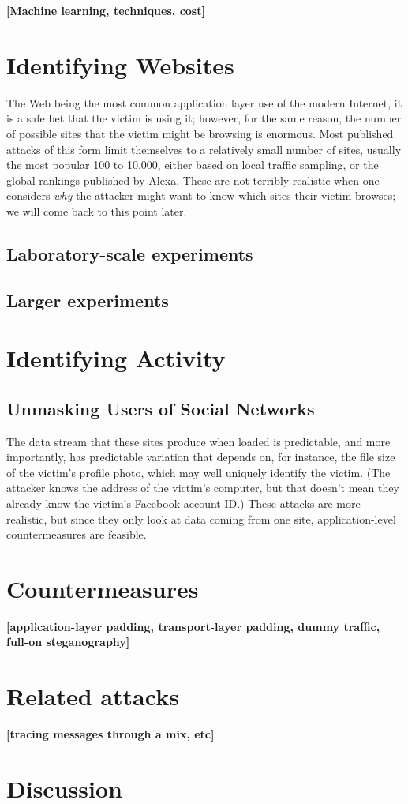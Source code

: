 \documentclass{zarticle}
\def\todo#1{{\color{todocolor}\bfseries [#1]}}
\begin{document}
\todo{Machine learning, techniques, cost}

\section{Identifying Websites}

The Web being the most common application layer use of the modern
Internet, it is a safe bet that the victim is using it; however, for
the same reason, the number of possible sites that the victim might be
browsing is enormous.  Most published attacks of this form limit
themselves to a relatively small number of sites, usually the most
popular 100 to 10,000, either based on local traffic sampling, or the
global rankings published by Alexa.  These are not terribly realistic
when one considers \emph{why} the attacker might want to know which
sites their victim browses; we will come back to this point later.

\subsection{Laboratory-scale experiments}

\subsection{Larger experiments}

\section{Identifying Activity}

\subsection{Unmasking Users of Social Networks}

The data stream that these sites produce when loaded is predictable,
and more importantly, has predictable variation that depends on, for
instance, the file size of the victim's profile photo, which may well
uniquely identify the victim.  (The attacker knows the address of the
victim's computer, but that doesn't mean they already know the
victim's Facebook account ID.)  These attacks are more realistic, but
since they only look at data coming from one site, application-level
countermeasures are feasible.

\section{Countermeasures}

\todo{application-layer padding, transport-layer padding, dummy
  traffic, full-on steganography}

\section{Related attacks}

\todo{tracing messages through a mix, etc}

\section{Discussion}

\printbibliography
\end{document}
